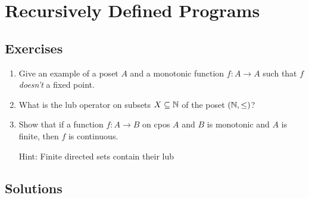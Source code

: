 \chapter{Recursively Defined Programs}

\section{Exercises}

\begin{enumerate}
    \item Give an example of a poset $A$ and a monotonic function $f \colon A \to A$ such that $f$ \textit{doesn't} a fixed point.

    \item What is the lub operator on subsets $X \subseteq \operatorname{\mathbb{N}}$ of the poset $(\operatorname{\mathbb{N}}, \leq)$?

    \item Show that if a function $f \colon A \to B$ on cpos $A$ and $B$ is monotonic and $A$ is finite, then $f$ is continuous.

    Hint: Finite directed sets contain their lub
\end{enumerate}

\section{Solutions}

